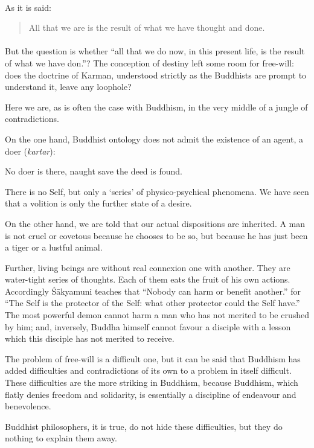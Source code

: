 \documentclass[a4paper, 11pt, oneside, english]{article}
\begin{document}
\paragraph{}
As it is said:
\begin{quotation}
\small
All that we are is the result of what we have thought and done.
\end{quotation}
\paragraph{}
But the question is whether ``all that we do now, in this present life, is the result of what we have don.''? The conception of destiny left some room for free-will: does the doctrine of Karman, understood strictly as the Buddhists are prompt to understand it, leave any loophole?

Here we are, as is often the case with Buddhism, in the very middle of a jungle of contradictions.

On the one hand, Buddhist ontology does not admit the existence of an agent, a doer (\emph{kartar}):

No doer is there, naught save the deed is found.

There is no Self, but only a `series' of physico-psychical phenomena. We have seen that a volition is only the further state of a desire.

On the other hand, we are told that our actual dispositions are inherited. A man is not cruel or covetous because he chooses to be so, but because he has just been a tiger or a lustful animal.

Further, living beings are without real connexion one with another. They are water-tight series of thoughts. Each of them eats the fruit of his own actions. Accordingly Śākyamuni teaches that ``Nobody can harm or benefit another.'' for ``The Self is the protector of the Self: what other protector could the Self have.'' The most powerful demon cannot harm a man who has not merited to be crushed by him; and, inversely, Buddha himself cannot favour a disciple with a lesson which this disciple has not merited to receive.

The problem of free-will is a difficult one, but it can be said that Buddhism has added difficulties and contradictions of its own to a problem in itself difficult. These difficulties are the more striking in Buddhism, because Buddhism, which flatly denies freedom and solidarity, is essentially a discipline of endeavour and benevolence.

Buddhist philosophers, it is true, do not hide these difficulties, but they do nothing to explain them away.
\end{document}
